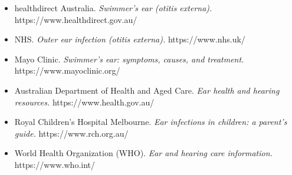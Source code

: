 \begin{itemize}
    \item healthdirect Australia. \textit{Swimmer's ear (otitis externa).} https://www.healthdirect.gov.au/
    \item NHS. \textit{Outer ear infection (otitis externa).} https://www.nhs.uk/
    \item Mayo Clinic. \textit{Swimmer's ear: symptoms, causes, and treatment.} https://www.mayoclinic.org/
    \item Australian Department of Health and Aged Care. \textit{Ear health and hearing resources.} https://www.health.gov.au/
    \item Royal Children's Hospital Melbourne. \textit{Ear infections in children: a parent's guide.} https://www.rch.org.au/
    \item World Health Organization (WHO). \textit{Ear and hearing care information.} https://www.who.int/
\end{itemize}

\clearpage
